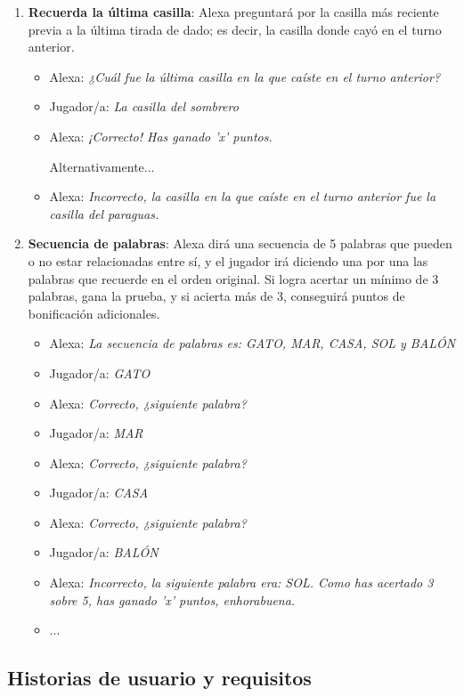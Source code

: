 \begin{enumerate}
	\item \textbf{Recuerda la última casilla}: Alexa preguntará por la casilla más reciente previa a la última tirada de dado; es decir, la casilla donde cayó en el turno anterior.
	\begin{itemize}
		\item Alexa: \textit{¿Cuál fue la última casilla en la que caíste en el turno anterior?}
		\item Jugador/a: \textit{La casilla del sombrero}
		\item Alexa: \textit{¡Correcto! Has ganado 'x' puntos.}
		
		Alternativamente...
		\item Alexa: \textit{Incorrecto, la casilla en la que caíste en el turno anterior fue la casilla del paraguas.}
	\end{itemize}
	
	\item \textbf{Secuencia de palabras}: Alexa dirá una secuencia de 5 palabras que pueden o no estar relacionadas entre sí, y el jugador irá diciendo una por una las palabras que recuerde en el orden original. Si logra acertar un mínimo de 3 palabras, gana la prueba, y si acierta más de 3, conseguirá puntos de bonificación adicionales.
	\begin{itemize}
		\item Alexa: \textit{La secuencia de palabras es: GATO, MAR, CASA, SOL y BALÓN}
		\item Jugador/a: \textit{GATO}
		\item Alexa: \textit{Correcto, ¿siguiente palabra?}
		\item Jugador/a: \textit{MAR}
		\item Alexa: \textit{Correcto, ¿siguiente palabra?}
		\item Jugador/a: \textit{CASA}
		\item Alexa: \textit{Correcto, ¿siguiente palabra?}
		\item Jugador/a: \textit{BALÓN}
		\item Alexa: \textit{Incorrecto, la siguiente palabra era: SOL. Como has acertado 3 sobre 5, has ganado 'x' puntos, enhorabuena.}
		\item ...
	\end{itemize}
\end{enumerate}


\subsection{Historias de usuario y requisitos}


